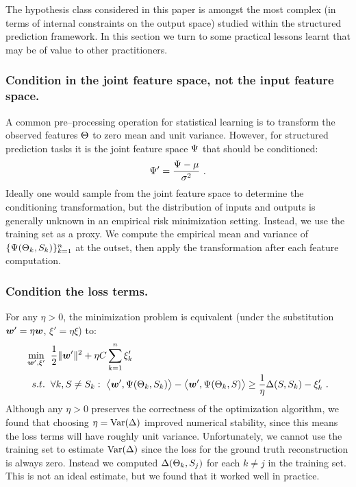 The hypothesis class considered in this paper is amongst the most
complex (in terms of internal constraints on the output space) studied
within the structured prediction framework. In this section we turn to
some practical lessons learnt that may be of value to other
practitioners.

\subsubsection{Condition in the joint feature space, not the input
  feature space.}

A common pre--processing operation for statistical learning is to
transform the observed features $\Theta$ to zero mean and unit
variance. However, for structured prediction tasks it is the joint
feature space $\Psi$ that should be conditioned:
\begin{equation}
  \label{eq:conditioning}
  \Psi' = \frac{\Psi - \mu}{\sigma^2} ~.
\end{equation}
Ideally one would sample from the joint feature space to determine the
conditioning transformation, but the distribution of inputs and
outputs is generally unknown in an empirical risk minimization
setting. Instead, we use the training set as a proxy. We compute the
empirical mean and variance of
$\{\Psi(\Theta_k,S_k)\}_{k=1}^n$ at the outset, then apply
the transformation  after each feature
computation.

\subsubsection{Condition the loss terms.}

For any $\eta>0$, the minimization problem  is
equivalent (under the substitution $\boldsymbol{w}'=\eta\boldsymbol{w}$,
$\xi'=\eta\xi$) to:
\begin{equation}
  \begin{split}
    \min_{\boldsymbol{w}',\xi'} &
      \hspace{2mm} 
    \frac{1}{2} \|\boldsymbol{w}'\|^2 +
      \eta C \sum_{k=1}^n \xi_k'\\
    s.t. & \hspace{2mm} \forall k, S \neq S_k:~
      \bigl\langle\boldsymbol{w}', \Psi(\Theta_k,S_k)\bigr\rangle -
      \bigl\langle\boldsymbol{w}', \Psi(\Theta_k,S)\bigr\rangle
      \geq
      \frac{1}{\eta} \Delta(S,S_k) - \xi_k' ~.
  \end{split}
  \label{eq:equiv-problem}
\end{equation}
Although any $\eta>0$ preserves the correctness of the optimization
algorithm, we found that choosing $\eta=\mbox{Var}(\Delta)$ improved
numerical stability, since this means the loss terms will have roughly
unit variance. Unfortunately, we cannot use the training set to
estimate $\mbox{Var}(\Delta)$ since the loss for the ground truth
reconstruction is always zero. Instead we computed
$\Delta(\Theta_k,S_j)$ for each $k \neq j$ in the training
set. This is not an ideal estimate, but we found that it worked well
in practice.

